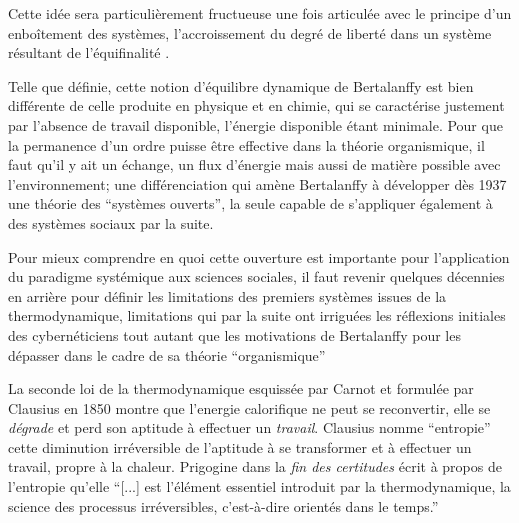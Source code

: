 Cette idée sera particulièrement fructueuse une fois articulée avec le principe d'un enboîtement des systèmes, l'accroissement du degré de liberté dans un système résultant de l'équifinalité \autocites[38]{Bertalanffy1973}[786-788]{Pouvreau2013}.



Telle que définie, cette notion d'équilibre dynamique de Bertalanffy est bien différente de celle produite en physique et en chimie, qui se caractérise justement par l'absence de travail disponible, l'énergie disponible étant minimale. Pour que la permanence d'un ordre puisse être effective dans la théorie organismique, il faut qu'il y ait un échange, un flux d'énergie mais aussi de matière possible avec l'environnement; une différenciation qui amène Bertalanffy à développer dès 1937 une théorie des \enquote{systèmes ouverts}, la seule capable de s'appliquer également à des systèmes sociaux par la suite.

Pour mieux comprendre en quoi cette ouverture est importante pour l'application du paradigme systémique aux sciences sociales, il faut revenir quelques décennies en arrière pour définir les limitations des premiers systèmes issues de la thermodynamique, limitations qui par la suite ont irriguées les réflexions initiales des cybernéticiens tout autant que les motivations de Bertalanffy pour les dépasser dans le cadre de sa théorie \enquote{organismique}

La seconde loi de la thermodynamique esquissée par Carnot et formulée par Clausius en 1850 montre que l'energie calorifique ne peut se reconvertir, elle se \textit{dégrade} et perd son aptitude à effectuer un \textit{travail}. Clausius nomme \enquote{entropie} cette diminution irréversible de l'aptitude à se transformer et à effectuer un travail, propre à la chaleur.\autocite[35]{Morin1977} Prigogine dans la \textit{fin des certitudes} écrit à propos de l'entropie qu'elle \enquote{[...] est l’élément essentiel introduit par la thermodynamique, la science des processus irréversibles, c’est-à-dire orientés dans le temps.}

